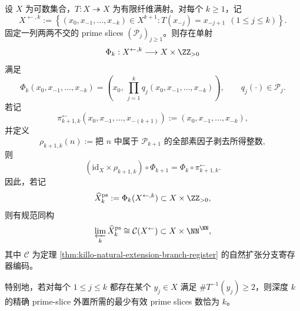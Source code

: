 \begin{theorem}\label{thm:xi-time-part53ac-primeslice-truncated-history-inverse-limit}
设 \(X\) 为可数集合，\(T:X\twoheadrightarrow X\) 为有限纤维满射。对每个 \(k\ge 1\)，记
\[
X^{\leftarrow,k}
:=
\left\{
(x_0,x_{-1},\dots,x_{-k})\in X^{k+1}:
T(x_{-j})=x_{-j+1}\ \ (1\le j\le k)
\right\}.
\]
固定一列两两不交的 prime slices \((\mathcal P_j)_{j\ge 1}\)。则存在单射
\[
\Phi_k:X^{\leftarrow,k}\longrightarrow X\times \ZZ_{>0}
\]
满足
\[
\Phi_k(x_0,x_{-1},\dots,x_{-k})
=
\left(
x_0,\,
\prod_{j=1}^{k}q_j(x_0,x_{-1},\dots,x_{-k})
\right),
\qquad
q_j(\cdot)\in \mathcal P_j.
\]
若记
\[
\pi_{k+1,k}^{\leftarrow}(x_0,x_{-1},\dots,x_{-(k+1)})
:=
(x_0,x_{-1},\dots,x_{-k}),
\]
并定义
\[
\rho_{k+1,k}(n)
:=
\text{把 \(n\) 中属于 \(\mathcal P_{k+1}\) 的全部素因子剥去所得整数},
\]
则
\[
(\mathrm{id}_X\times \rho_{k+1,k})\circ \Phi_{k+1}
=
\Phi_k\circ \pi_{k+1,k}^{\leftarrow}.
\]
因此，若记
\[
\widehat X_k^{\mathrm{ps}}
:=
\Phi_k(X^{\leftarrow,k})\subset X\times \ZZ_{>0},
\]
则有规范同构
\[
\varprojlim_k \widehat X_k^{\mathrm{ps}}
\cong
\mathcal C(X^{\leftarrow})\subset X\times \NN^\NN,
\]
其中 \(\mathcal C\) 为定理 \ref{thm:killo-natural-extension-branch-register} 的自然扩张分支寄存器编码。

特别地，若对每个 \(1\le j\le k\) 都存在某个 \(y_j\in X\) 满足 \(\#T^{-1}(y_j)\ge 2\)，则深度 \(k\) 的精确 prime-slice 外置所需的最少有效 prime slices 数恰为 \(k\)。
\end{theorem}
